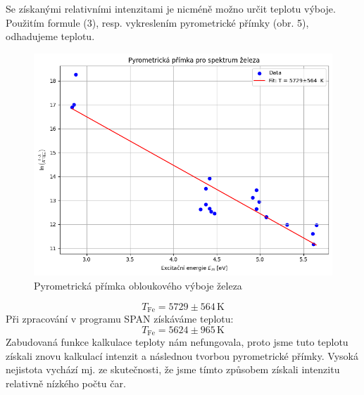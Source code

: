 \documentclass[czech,11pt,a4paper]{article}
\begin{document}
\begin{multicols}{2}
\begin{figure}[H]
		\end{figure}
		Se získanými relativními intenzitami je nicméně možno určit teplotu výboje. Použitím formule (3), resp. vykreslením pyrometrické přímky (obr. 5), odhadujeme teplotu.
		\begin{figure}[H]
			\centering
			\includegraphics[width=0.9\linewidth]{pyrometrika}
			\caption{Pyrometrická přímka obloukového výboje železa}			
		\end{figure}
		\begin{equation*}
			T_{\mathrm{Fe}} = 5729 \pm 564 \,\mathrm{K}
		\end{equation*}
		Při zpracování v programu SPAN získáváme teplotu:
		\begin{equation*}
			T_{\mathrm{Fe}} = 5624 \pm 965 \,\mathrm{K}
		\end{equation*}
		Zabudovaná funkce kalkulace teploty nám nefungovala, proto jsme tuto teplotu získali znovu kalkulací intenzit a následnou tvorbou pyrometrické přímky. Vysoká nejistota vychází mj. ze skutečnosti, že jsme tímto způsobem získali intenzitu relativně nízkého počtu čar.

\end{multicols}
\end{document}
